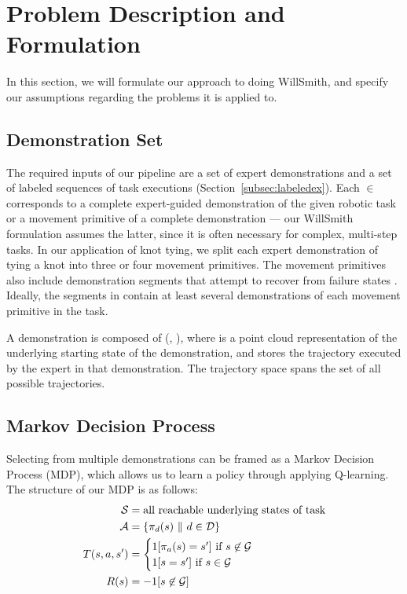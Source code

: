 \section{Problem Description and Formulation}
\label{sec:formulation}
%

In this section, we will formulate our approach to doing WillSmith, and
specify our assumptions regarding the problems it is applied to.

\subsection{Demonstration Set}

The required inputs of our pipeline are a set \demoset{}
of expert demonstrations and a set  of labeled sequences of
task executions (Section~\ref{subsec:labeledex}).
Each \demovar{} $\in$ \demoset{} corresponds to a complete expert-guided
demonstration of the given robotic task or a movement primitive of a complete
demonstration --- our WillSmith formulation assumes the latter,
since it is often necessary for complex, multi-step tasks.
In our application of knot tying, we split each expert demonstration of
tying a knot into three or four movement primitives. The movement primitives
also include demonstration segments that attempt to
recover from failure states \cite{Schulmanetal_ISRR2013}.
Ideally, the segments in \demoset{} contain at least several demonstrations
of each movement primitive in the task.

A demonstration \demovar{} is composed of (, ),
where  is a point cloud representation of the underlying
starting state of the demonstration, and  stores
the trajectory executed by the expert in that demonstration. The trajectory
space \trajset{} spans the set of all possible trajectories.

\subsection{Markov Decision Process}
Selecting from multiple demonstrations can be framed as a Markov Decision
Process (MDP), which allows us to learn a policy through applying Q-learning. The structure of our MDP is as follows:
\begin{align*}
\mathcal{S}{} &=  \text{all reachable underlying states of task} \\
\mathcal{A}{} &= \{\pi_{d{}}(s{})\ \| \text{ } d{} \in \mathcal{D}{}\} \\
T{}(s{}, a{}, s'{}) &=
    \begin{cases}
    1[\pi_{a{}}(s{}) = s'{}] \text{ if } s{} \not \in \mathcal{G}{} \\
    1[s{} = s{}'] \text{ if } s{} \in \mathcal{G}{}
    \end{cases}\\
R(s{}) &= -1 {[ s{} \not \in \mathcal{G}{} ]} \\
\end{align*}

